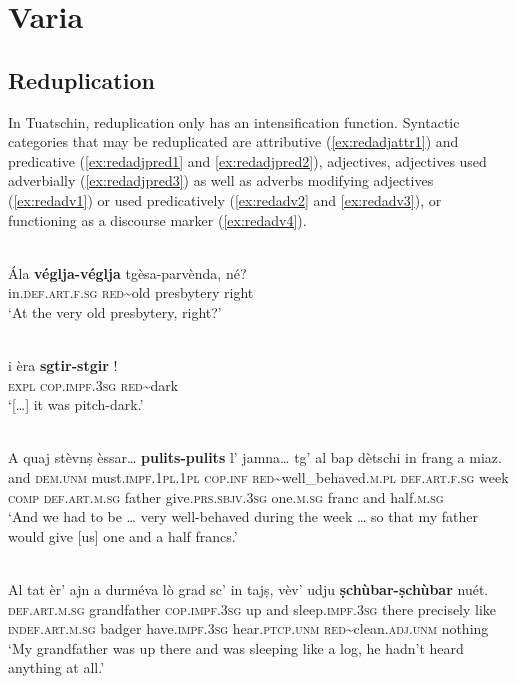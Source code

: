 \chapter{Varia}

\section{Reduplication}
In Tuatschin, reduplication only has an intensification function. Syntactic categories that may be reduplicated are attributive (\ref{ex:redadjattr1}) and predicative (\ref{ex:redadjpred1} and \ref{ex:redadjpred2}),  adjectives, adjectives used adverbially (\ref{ex:redadjpred3}) as well as adverbs modifying adjectives (\ref{ex:redadv1}) or used predicatively (\ref{ex:redadv2} and \ref{ex:redadv3}), or functioning as a discourse marker (\ref{ex:redadv4}).

\ea\label{ex:redadjattr1}
\\
\gll  Ála \textbf{véglja-véglja} tgèsa-parvènda, né?  \\
in.\textsc{def.art.f.sg} \textsc{red}\textasciitilde{old} presbytery right\\
\glt `At the very old presbytery, right?'
\z

\ea\label{ex:redadjpred1}
\\
\gll  […] i èra \textbf{sgtir-stgir} !\\
     […]  \textsc{expl} \textsc{cop.impf.3sg} \textsc{red}\textasciitilde{dark}\\
\glt `[…] it was pitch-dark.'
\z

\ea\label{ex:redadjpred2}
\\
\gll    A quaj stèvnṣ èssar… \textbf{pulits-pulits} l’ jamna… tg’ al bap dètschi in frang a miaz.\\
and \textsc{dem.unm} must.\textsc{impf.1pl.1pl} \textsc{cop.inf} \textsc{red}\textasciitilde{well\_behaved}.\textsc{m.pl} \textsc{def.art.f.sg} week  \textsc{comp} \textsc{def.art.m.sg} father  give.\textsc{prs.sbjv.3sg} one.\textsc{m.sg} franc and half.\textsc{m.sg}\\
\glt `And we had to be … very well-behaved during the week … so that my father would give [us] one and a half francs.'
\z

\ea\label{ex:redadjpred3}
\\
\gll  Al tat èr’ ajn a durméva lò grad sc’ in tajṣ, vèv’ udju \textbf{ṣchùbar-ṣchùbar} nuét.  \\
\textsc{def.art.m.sg} grandfather \textsc{cop.impf.3sg} up and sleep.\textsc{impf.3sg} there precisely like \textsc{indef.art.m.sg} badger have.\textsc{impf.3sg} hear.\textsc{ptcp.unm} \textsc{red}\textasciitilde{clean}.\textsc{adj.unm} nothing\\
\glt `My grandfather was up there and was sleeping like a log, he hadn’t heard anything at all.'
\z

